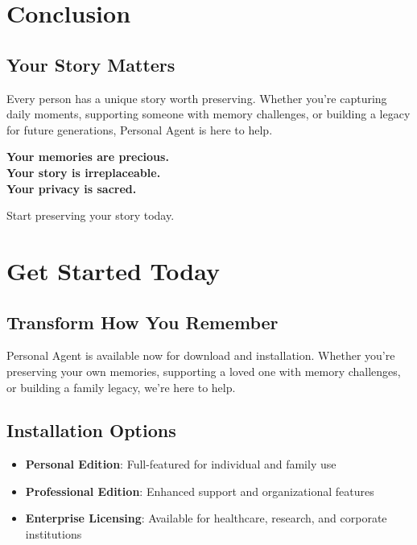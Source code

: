 \documentclass[11pt,letterpaper]{article}
\begin{document}
\newpage
\section{Conclusion}

\subsection{Your Story Matters}

Every person has a unique story worth preserving. Whether you're capturing daily moments, supporting someone with memory challenges, or building a legacy for future generations, Personal Agent is here to help.

\begin{center}
\Large
\textbf{Your memories are precious.}\\
\textbf{Your story is irreplaceable.}\\
\textbf{Your privacy is sacred.}
\end{center}

\vspace{1cm}

\begin{center}
\large
Start preserving your story today.
\end{center}

\newpage
\section{Get Started Today}

\subsection{Transform How You Remember}

Personal Agent is available now for download and installation. Whether you're preserving your own memories, supporting a loved one with memory challenges, or building a family legacy, we're here to help.

\subsection{Installation Options}
\begin{itemize}[leftmargin=*]
    \item \textbf{Personal Edition}: Full-featured for individual and family use
    \item \textbf{Professional Edition}: Enhanced support and organizational features
    \item \textbf{Enterprise Licensing}: Available for healthcare, research, and corporate institutions
\end{itemize}
\end{document}

